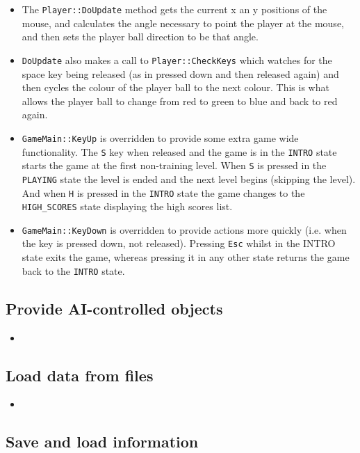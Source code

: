 \begin{itemize}
	\item The \verb!Player::DoUpdate! method gets the current x an y positions of the mouse, and calculates the angle necessary to point the player at the mouse, and then sets the player ball direction to be that angle.
	\item \verb!DoUpdate! also makes a call to \verb!Player::CheckKeys! which watches for the space key being released (as in pressed down and then released again) and then cycles the colour of the player ball to the next colour. This is what allows the player ball to change from red to green to blue and back to red again.
	\item \verb!GameMain::KeyUp! is overridden to provide some extra game wide functionality. The \verb!S! key when released and the game is in the \verb!INTRO! state starts the game at the first non-training level. When \verb!S! is pressed in the \verb!PLAYING! state the level is ended and the next level begins (skipping the level). And when \verb!H! is pressed in the \verb!INTRO! state the game changes to the \verb!HIGH_SCORES! state displaying the high scores list.
	\item \verb!GameMain::KeyDown! is overridden to provide actions more quickly (i.e. when the key is pressed down, not released). Pressing \verb!Esc! whilst in the INTRO state exits the game, whereas pressing it in any other state returns the game back to the \verb!INTRO! state.
\end{itemize}

\subsection{Provide AI-controlled objects}

\begin{itemize}
	\item
\end{itemize}

\subsection{Load data from files}

\begin{itemize}
	\item
\end{itemize}

\subsection{Save and load information}

